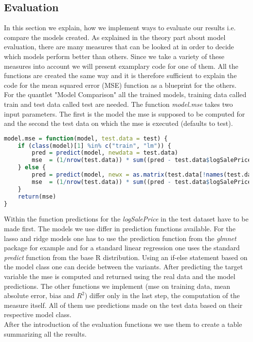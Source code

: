 \subsection{Evaluation}
In this section we explain, how we implement ways to evaluate our results i.e. compare the models created. As explained in the theory part about model evaluation, there are many measures that can be looked at in order to decide which models perform better than others. Since we take a variety of these measures into account we will present examplary code for one of them. All the functions are created the same way and it is therefore sufficient to explain the code for the mean squared error (MSE) function as a blueprint for the others. \\
For the quantlet "Model Comparison" all the trained models, training data called train and test data called test are needed. The function \textit{model.mse} takes two input parameters. The first is the model the mse is supposed to be computed for and the second the test data on which the mse is executed (defaults to test). 
\begin{lstlisting}[language=R]
model.mse = function(model, test.data = test) {
    if (class(model)[1] %in% c("train", "lm")) {
        pred = predict(model, newdata = test.data)
        mse  = (1/nrow(test.data)) * sum((pred - test.data$logSalePrice)^2)
    } else {
        pred = predict(model, newx = as.matrix(test.data[!names(test.data) %in% "logSalePrice"]), s = "lambda.1se")
        mse  = (1/nrow(test.data)) * sum((pred - test.data$logSalePrice)^2)
    }
    return(mse)
}
\end{lstlisting}
Within the function predictions for the \textit{logSalePrice} in the test dataset have to be made first. The models we use differ in prediction functions available. For the lasso and ridge models one has to use the prediction function from the \textit{glmnet} package for example and for a standard linear regression one uses the standard \textit{predict} function from the base R distribution. Using an if-else statement based on the model class one can decide between the variants. After predicting the target variable the mse is computed and returned using the real data and the model predictions. The other functions we implement (mse on training data, mean absolute error, bias and $R^2$) differ only in the last step, the computation of the measure itself. All of them use predictions made on the test data based on their respective model class. \\
After the introduction of the evaluation functions we use them to create a table summarizing all the results.

